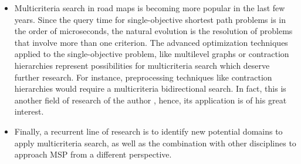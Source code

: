 \begin{itemize}
	\item Multicriteria search in road maps is becoming more popular in the last few years. Since the query time for single-objective shortest path problems is in the order of microseconds, the natural evolution is the resolution of problems that involve more than one criterion. The advanced optimization techniques applied to the single-objective problem, like multilevel graphs \citep{schulzetal2002} or contraction hierarchies \citep{Geisberger2008} represent possibilities for multicriteria search which deserve further research. For instance, preprocessing techniques like contraction hierarchies would require a multicriteria bidirectional search. In fact, this is another field of research of the author \citep{Pulido2011,Pulido2012}, hence, its application is of his great interest.   

	\item Finally, a recurrent line of research is to identify new potential domains to apply multicriteria search, as well as the combination with other disciplines to approach MSP from a different perspective.

\end{itemize}	
